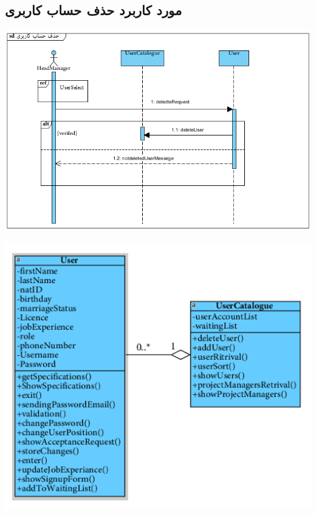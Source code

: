 \subsection*{مورد کاربرد حذف حساب کاربری}
\vspace{2cm}
\begin{center}
\includegraphics[width=\textwidth]{SequenceDiagrams/7.png}
\end{center}

\newpage
\vspace{2cm}
\begin{center}
\includegraphics[width=\textwidth]{SequenceClasses/7.png}
\end{center}

